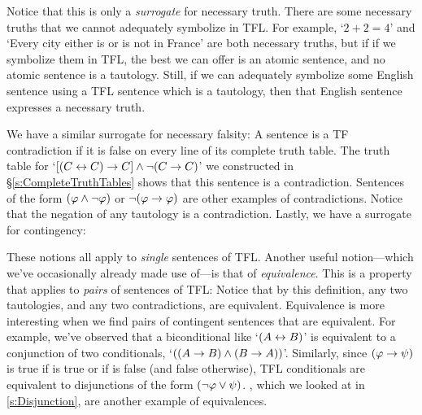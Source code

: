 Notice that this is only a \emph{surrogate} for necessary truth. There are some necessary truths that we cannot adequately symbolize in TFL. For example, `$2 + 2 = 4$' and `Every city either is or is not in France' are both necessary truths, but if if we symbolize them in TFL, the best we can offer is an atomic sentence, and no atomic sentence is a tautology. Still, if we can adequately symbolize some English sentence using a TFL sentence which is a tautology, then that English sentence expresses a necessary truth.

We have a similar surrogate for necessary falsity:
A sentence is a TF contradiction if it is false on every line of its complete truth table. The truth table for `$[(C\leftrightarrow C) \rightarrow C] \wedge \neg(C \rightarrow C)$' we constructed in \S\ref{s:CompleteTruthTables} shows that this sentence is a contradiction.  Sentences of the form $(\mathcal{\varphi} \wedge \neg \mathcal{\varphi})$ or $\neg(\mathcal{\varphi} \rightarrow \mathcal{\varphi})$ are other examples of contradictions.  Notice that the negation of any tautology is a contradiction.  Lastly, we have a surrogate for contingency: 


These notions all apply to \emph{single} sentences of TFL.  Another useful notion---which we've occasionally already made use of---is that of \emph{equivalence}.  This is a property that applies to \emph{pairs} of sentences of TFL:
Notice that by this definition, any two tautologies, and any two contradictions, are equivalent.  Equivalence is more interesting when we find pairs of contingent sentences that are equivalent.  For example, we've observed that a biconditional like `$(A \leftrightarrow B)$' is equivalent to a conjunction of two conditionals, `$((A \rightarrow B) \wedge (B \rightarrow A))$'.  Similarly, since $(\mathcal{\varphi} \rightarrow \mathcal{\psi})$ is true if  \meta{\varphi} is true or if \meta{\psi} is false (and false otherwise),  TFL conditionals are equivalent to disjunctions of the form $(\neg \mathcal{\varphi} \vee \mathcal{\psi})$.  , which we looked at in \ref{s:Disjunction}, are another example of equivalences.

